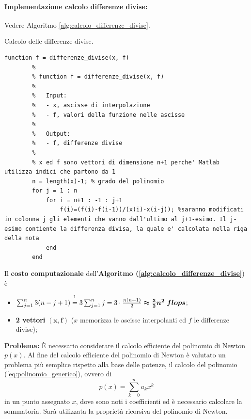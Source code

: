 \paragraph{Implementazione calcolo differenze divise:} Vedere Algoritmo \ref{alg:calcolo_differenze_divise}.

\begin{algorithm}
\caption{Calcolo delle differenze divise.}\label{alg:calcolo_differenze_divise}
    \begin{lstlisting}[style=Matlab-editor]
    	function f = differenze_divise(x, f)
    	%
    	% function f = differenze_divise(x, f)
    	%
    	%	Input:
        %	- x, ascisse di interpolazione
        % 	- f, valori della funzione nelle ascisse
        %
        %	Output:
        %	- f, differenze divise
        %
        % x ed f sono vettori di dimensione n+1 perche' Matlab utilizza indici che partono da 1
        n = length(x)-1; % grado del polinomio
        for j = 1 : n
            for i = n+1 : -1 : j+1
                f(i)=(f(i)-f(i-1))/(x(i)-x(i-j)); %saranno modificati in colonna j gli elementi che vanno dall'ultimo al j+1-esimo. Il j-esimo contiente la differenza divisa, la quale e' calcolata nella riga della nota
            end
        end
    \end{lstlisting}
\end{algorithm}

\begin{remark} Il \textbf{costo computazionale} dell'\textbf{Algoritmo (\ref{alg:calcolo_differenze_divise}}) è
    \begin{itemize}
        \item $\sum_{j=1}^{n}3(n-j+1)\overset{\footnotemark}{=} 3\sum_{j=1}^{n}j=3\cdot\frac{n(n+1)}{2}\boldsymbol{\approx \frac{3}{2}n^2\; flops}$; 
        \item \textbf{2 vettori} $\boldsymbol{(x, f)}$ ($x$ memorizza le ascisse interpolanti ed $f$ le differenze divise);
    \end{itemize}
\end{remark}

\noindent\textbf{Problema:} È necessario considerare il calcolo efficiente del polinomio di Newton $p(x)$. Al fine del calcolo efficiente del polinomio di Newton è valutato un problema più semplice rispetto alla base delle potenze, il calcolo del polinomio (\ref{eq:polinomio_generico}), ovvero di
\begin{equation}\label{eq:polinomio_generico_ridef}
	p(x)=\sum_{k=0}^{n}a_kx^k
\end{equation}
in un punto assegnato $x$, dove sono noti i coefficienti ed è necessario calcolare la sommatoria. Sarà utilizzata la proprietà ricorsiva del polinomio di Newton.

